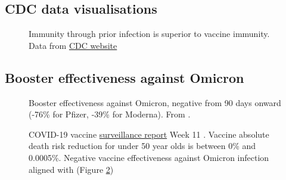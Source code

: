 \documentclass[11pt,a4paper,notitlepage]{report}
\begin{document}
\clearpage

\subsection*{CDC data visualisations}

\begin{figure}[h]
    \centering
    \caption{Immunity through prior infection is superior to vaccine immunity. Data from \href{https://www.cdc.gov/mmwr/volumes/71/wr/mm7104e1.htm}{CDC website} \cite{cdc28012020}}
    \label{fig:CDC-natural-immunity}
\end{figure}

\clearpage

\subsection*{Booster effectiveness against Omicron}

\begin{figure}[h]
    \centering
    \caption{Booster effectiveness against Omicron, negative from 90 days onward (-76\% for Pfizer, -39\% for Moderna). From \citet{Hansen2021.12.20.21267966}.}
    \label{fig:Omicron-vaccine}
\end{figure}


\begin{figure}[h]
    \centering
    \caption{COVID-19 vaccine \href{https://assets.publishing.service.gov.uk/government/uploads/system/uploads/attachment_data/file/1061532/Vaccine_surveillance_report_-_week_11.pdf}{surveillance report} Week 11 \cite{ukhsa17032022}. Vaccine absolute death risk reduction for under 50 year olds is between 0\% and 0.0005\%. Negative vaccine effectiveness against Omicron infection aligned with \citet{Hansen2021.12.20.21267966} (Figure \ref{fig:Omicron-vaccine})}
    \label{fig:UK-report-w11}
\end{figure}
\end{document}
